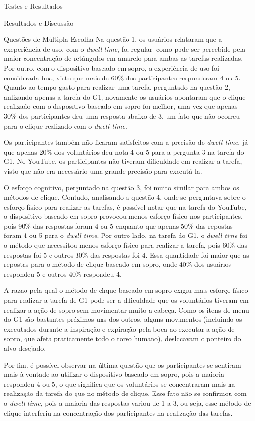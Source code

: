 \begin{chapter}{Testes e Resultados}
\begin{section}{Resultados e Discussão}
\begin{subsection}{Questões de Múltipla Escolha}
Na questão 1, os usuários relataram que a exeperiência de uso, com o
\textit{dwell time}, foi regular, como pode ser percebido pela maior
concentração de retângulos em amarelo para ambas as tarefas realizadas. Por
outro, com o dispositivo baseado em sopro, a experiência de uso foi considerada
boa, visto que mais de 60\% dos participantes responderam 4 ou 5.  Quanto ao
tempo gasto para realizar uma tarefa, perguntado na questão 2, anlizando apenas
a tarefa do G1, novamente os usuários apontaram que o clique realizado com o
dispositivo baseado em sopro foi melhor, uma vez que apenas 30\% dos
participantes deu uma resposta abaixo de 3, um fato que não ocorreu para o
clique realizado com o \textit{dwell time}.

Os participantes também não ficaram satisfeitos com a precisão do \textit{dwell
time}, já que apenas 20\% dos voluntários deu nota 4 ou 5 para a pergunta 3 na
tarefa do G1. No YouTube, os participantes não tiveram dificuldade em realizar a
tarefa, visto que não era necessário uma grande precisão para executá-la. 

O esforço cognitivo, perguntado na questão 3, foi muito similar para ambos os
métodos de clique. Contudo, analisando a questão 4, onde se perguntava sobre o
esforço físico para realizar as tarefas, é possível notar que na tarefa do
YouTube, o dispositivo baseado em sopro provocou menos esforço físico nos
participantes, pois 90\% das respostas foram 4 ou 5 enquanto que apenas 50\%
das repostas foram 4 ou 5 para o \textit{dwell time}. Por outro lado, na tarefa
do G1, o \textit{dwell time} foi o método que necessitou menos esforço físico
para realizar a tarefa, pois 60\% das respostas foi 5 e outros 30\% das
respostas foi 4. Essa quantidade foi maior que as repostas para o método de
clique baseado em sopro, onde 40\% dos usuários respondeu 5 e outros 40\%
respondeu 4.

A razão pela qual o método de clique baseado em sopro exigiu mais esforço físico
para realizar a tarefa do G1 pode ser a dificuldade que os voluntários tiveram
em realizar a ação de sopro sem movimentar muito a cabeça. Como os itens do menu
do G1 são bastantes próximos uns dos outros, alguns movimentos (incluindo os
executados durante a inspiração e expiração pela boca ao executar a ação de
sopro, que afeta praticamente todo o torso humano), deslocavam o ponteiro do
alvo desejado.

Por fim, é possível observar na última questão que os participantes se sentiram
mais à vontade ao utilizar o dispositivo baseado em sopro, pois a maioria
respondeu 4 ou 5, o que significa que os voluntários se concentraram mais na
realização da tarefa do que no método de clique. Esse fato não se confirmou com o
\textit{dwell time}, pois a maioria das respostas variou de 1 a 3, ou seja, esse
método de clique interferiu na concentração dos participantes na realização das
tarefas. 


\end{subsection}
\end{section}
\end{chapter}
